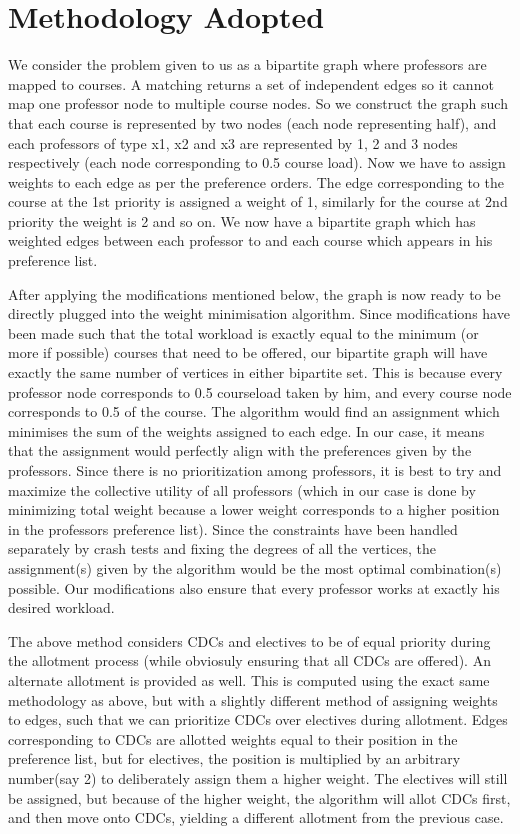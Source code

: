 \documentclass{article}
\begin{document}
\section{Methodology Adopted}
We consider the problem given to us as a bipartite graph where professors are mapped to courses. A matching returns a set of independent edges so it cannot map one professor node to multiple course nodes. So we construct the graph such that each course is represented by two nodes (each node representing half), and each professors of type x1, x2 and x3 are represented by 1, 2 and 3 nodes respectively (each node corresponding to 0.5 course load). Now we have to assign weights to each edge as per the preference orders. The edge corresponding to the course at the 1st priority is assigned a weight of 1, similarly for the course at 2nd priority the weight is 2 and so on. We now have a bipartite graph which has weighted edges between each professor to and each course which appears in his preference list. \par
After applying the modifications mentioned below, the graph is now ready to be directly plugged into the weight minimisation algorithm. Since modifications have been made such that the total workload is exactly equal to the minimum (or more if possible) courses that need to be offered, our bipartite graph will have exactly the same number of vertices in either bipartite set. This is because every professor node corresponds to 0.5 courseload taken by him, and every course node corresponds to 0.5 of the course. The algorithm would find an assignment which minimises the sum of the weights assigned to each edge. In our case, it means that the assignment would perfectly align with the preferences given by the professors. Since there is no prioritization among professors, it is best to try and maximize the collective utility of all professors (which in our case is done by minimizing total weight because a lower weight corresponds to a higher position in the professors preference list). Since the constraints have been handled separately by crash tests and fixing the degrees of all the vertices, the assignment(s) given by the algorithm would be the most optimal combination(s) possible. Our modifications also ensure that every professor works at exactly his desired workload. \par
The above method considers CDCs and electives to be of equal priority during the allotment process (while obviosuly ensuring that all CDCs are offered). An alternate allotment is provided as well. This is computed using the exact same methodology as above, but with a slightly different method of assigning weights to edges, such that we can prioritize CDCs over electives during allotment. Edges corresponding to CDCs are allotted weights equal to their position in the preference list, but for electives, the position is multiplied by an arbitrary number(say 2) to deliberately assign them a higher weight. The electives will still be assigned, but because of the higher weight, the algorithm will allot CDCs first, and then move onto CDCs, yielding a different allotment from the previous case.
\end{document}
